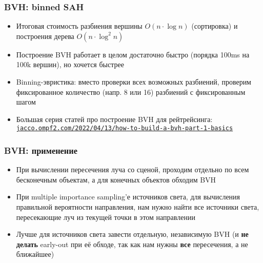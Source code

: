 \documentclass[10pt]{beamer}
\begin{document}
\begin{frame}[fragile]
\frametitle{BVH: binned SAH}
\begin{itemize}
\item Итоговая стоимость разбиения вершины \begin{math}O(n\cdot \log n)\end{math} (сортировка) и построения дерева \begin{math}O(n\cdot \log^2 n)\end{math}
\pause
\item Построение BVH работает в целом достаточно быстро (порядка 100ms на 100k вершин), но хочется быстрее
\pause
\item Binning-эвристика: вместо проверки всех возможных разбиений, проверим фиксированное количество (напр. 8 или 16) разбиений с фиксированным шагом
\pause
\item Большая серия статей про построение BVH для рейтрейсинга: \href{https://jacco.ompf2.com/2022/04/13/how-to-build-a-bvh-part-1-basics/}{\texttt{jacco.ompf2.com/2022/04/13/how-to-build-a-bvh-part-1-basics}}
\end{itemize}
\end{frame}

\begin{frame}[fragile]
\frametitle{BVH: применение}
\begin{itemize}
\item При вычислении пересечения луча со сценой, проходим отдельно по всем бесконечным объектам, а для конечных объектов обходим BVH
\pause
\item При multiple importance sampling'е источников света, для вычисления правильной вероятности направления, нам нужно найти все источники света, пересекающие луч из текущей точки в этом направлении
\pause
\item Лучше для источников света завести отдельную, независимую BVH (и \textbf{не делать} early-out при её обходе, так как нам нужны \textbf{все} пересечения, а не ближайшее)
\end{itemize}
\end{frame}
\end{document}
